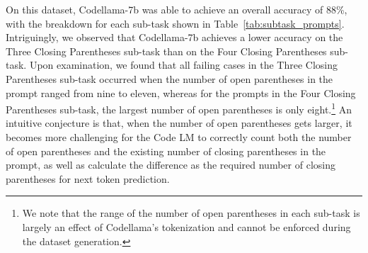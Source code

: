 On this dataset, Codellama-7b was able to achieve an overall accuracy of 88\%, with the breakdown for each sub-task shown in Table~\ref{tab:subtask_prompts}. 
Intriguingly, we observed that Codellama-7b achieves a lower accuracy on the Three Closing Parentheses sub-task than on the Four Closing Parentheses sub-task. Upon examination, we found that all failing cases in the Three Closing Parentheses sub-task occurred when the number of open parentheses in the prompt ranged from nine to eleven, whereas for the prompts in the Four Closing Parentheses sub-task, the largest number of open parentheses is only eight.\footnote{We note that the range of the number of open parentheses in each sub-task is largely an effect of Codellama's tokenization and cannot be enforced during the dataset generation.} An intuitive conjecture is that, when the number of open parentheses gets larger, it becomes more challenging for the Code LM to correctly count both the number of open parentheses and the existing number of closing parentheses in the prompt, as well as calculate the difference as the required number of closing parentheses for next token prediction.


